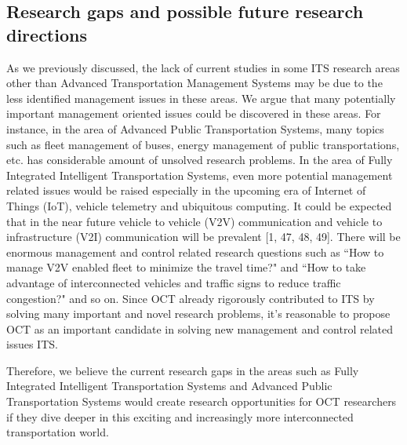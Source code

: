 \documentclass[12pt,onecolumn,twoside]{JCTA}
\theoremstyle{mystyle}
\begin{document}
\subsection{Research gaps and possible future research directions}
As we previously discussed, the lack of current studies in some ITS research areas other than Advanced Transportation Management Systems may be due to the less identified management issues in these areas. We argue that many potentially important management oriented issues could be discovered in these areas. For instance, in the area of Advanced Public Transportation Systems, many topics such as fleet management of buses, energy management of public transportations, etc. has considerable amount of unsolved research problems. In the area of Fully Integrated Intelligent Transportation Systems, even more potential management related issues would be raised especially in the upcoming era of Internet of Things (IoT), vehicle telemetry and ubiquitous computing. It could be expected that in the near future vehicle to vehicle (V2V) communication and vehicle to infrastructure (V2I) communication will be prevalent [1, 47, 48, 49]. There will be enormous management and control related research questions such as ``How to manage V2V enabled fleet to minimize the travel time?" and ``How to take advantage of interconnected vehicles and traffic signs to reduce traffic congestion?" and so on. Since OCT already rigorously contributed to ITS by solving many important and novel research problems, it{\textquoteright}s reasonable to propose OCT as an important candidate in solving new management and control related issues ITS.

Therefore, we believe the current research gaps in the areas such as Fully Integrated Intelligent Transportation Systems and Advanced Public Transportation Systems would create research opportunities for OCT researchers if they dive deeper in this exciting and increasingly more interconnected transportation world.
\end{document}
